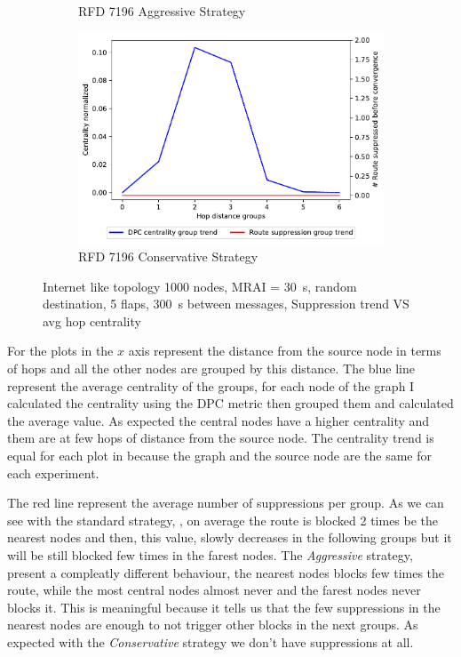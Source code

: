 \begin{figure}[h]
\begin{subfigure}[b]{0.325\textwidth}
         \caption{RFD 7196 Aggressive Strategy}
         \label{fig:1000_7196RFDA_centVSsup}
     \end{subfigure}
     \hfill
     \begin{subfigure}[b]{0.325\textwidth}
         \centering
         \includegraphics[width=\textwidth]{images/RFD/miceVSelephants/mice/cisco_1000_RFD_7196_conservative_nodeConvergence_centVSsup_trend.pdf}
         \caption{RFD 7196 Conservative Strategy}
         \label{fig:1000_7196RFDC_centVSsup}
     \end{subfigure}
		\caption{Internet like topology \num{1000} nodes, \ac{MRAI} = \SI{30}{\second}, random destination, \num{5} flaps, \SI{300}{\second} between messages, Suppression trend VS avg hop centrality}
        \label{fig:1000_RFD_centVSsup}
\end{figure}

For the plots in  the $x$ axis represent the distance
from the source node in terms of hops and all the other nodes are grouped by this
distance.
The blue line represent the average centrality of the groups, for each node of the
graph I calculated the centrality using the \ac{DPC} metric then grouped them
and calculated the average value.
As expected the central nodes have a higher centrality and them are at few hops
of distance
from the source node.
The centrality trend is equal for each plot in 
because the graph and the source node are the same for each experiment.

The red line represent the average number of suppressions per group.
As we can see with the standard strategy, , 
on average the route is blocked \num{2} times be the nearest nodes and then, 
this value, slowly decreases in the following groups but it will be still
blocked few times in the farest nodes.
The \textit{Aggressive} strategy,  present
a compleatly different behaviour, the nearest nodes blocks few times the 
route, while the most central nodes almost never and the farest nodes never
blocks it.
This is meaningful because it tells us that the few suppressions in the nearest
nodes are enough to not trigger other blocks in the next groups.
As expected with the \textit{Conservative} strategy we don't have suppressions at
all.

